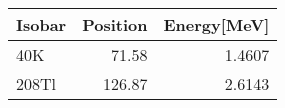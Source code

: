 \begin{tabular}{lrr}
\toprule
Isobar &  Position &  Energy[MeV] \\
\midrule
   40K &     71.58 &       1.4607 \\
 208Tl &    126.87 &       2.6143 \\
\bottomrule
\end{tabular}

